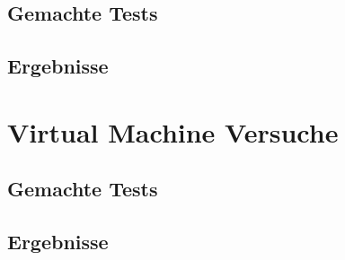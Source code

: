 \subsection{Gemachte Tests}
\subsection{Ergebnisse}

\section{Virtual Machine Versuche}
\label{sec:VMVersuche}
\subsection{Gemachte Tests}
\subsection{Ergebnisse}


